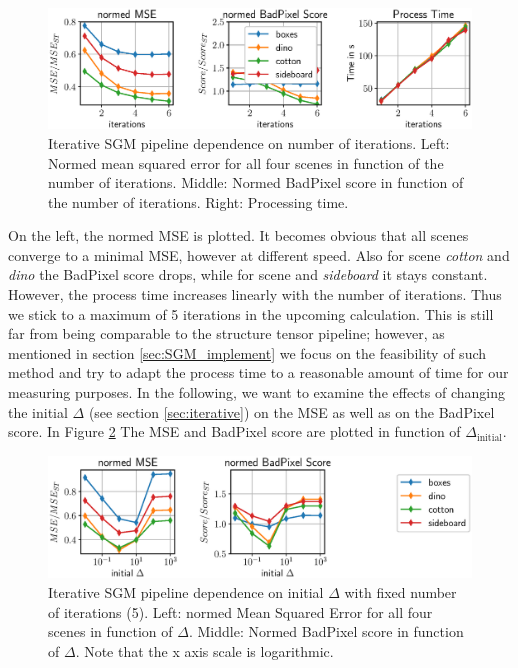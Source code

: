 \documentclass  [
  paper    = a4,
  BCOR     = 10mm,
  twoside,
  fontsize = 12pt,
  fleqn,
  toc      = bibnumbered,
  toc      = listofnumbered,
  numbers  = noendperiod,
  headings = normal,
  listof   = leveldown,
  version  = 3.03
]                                       {scrreprt}
\begin{document}
\begin{figure}[h!]
	\centering
	\includegraphics[width=1\linewidth]{images/choose_lower_sgm_ppr_merge_iterations}
	\caption[Iterative SGM dependence on number of iterations]{Iterative SGM pipeline dependence on number of iterations. Left: Normed mean squared error for all four scenes in function  of the number of iterations. Middle: Normed BadPixel score in function of the number of iterations. Right: Processing time.}
	\label{fig:chooselowersgmpprmergeiterations}
\end{figure}
On the left, the normed MSE is plotted. It becomes obvious that all scenes converge to a minimal MSE, however at different speed. Also for scene \textit{cotton} and \textit{dino} the BadPixel score drops, while for scene  and \textit{sideboard} it stays constant. However, the process time increases linearly with the number of iterations. Thus we stick to a maximum of 5 iterations in the upcoming calculation. This is still far from being comparable to the structure tensor pipeline; however, as mentioned in section \ref{sec:SGM_implement} we focus on the feasibility of such method and try to adapt the process time to a reasonable amount of time for our measuring purposes.
In the following, we want to examine the effects of changing the initial $\Delta$ (see section \ref{sec:iterative}) on the MSE as well as on the BadPixel score. In Figure \ref{fig:chooselowersgmppriterations5smoothingdelta} The MSE and BadPixel score are plotted in function of $\Delta_\text{initial}$.
\begin{figure}[h!]
	\centering
	\includegraphics[width=1\linewidth]{images/choose_lower_sgm_ppr_iterations_5_smoothing_delta}
	\caption[Iterative SGM dependence on initial $\Delta$ with 5 iterations]{Iterative SGM pipeline dependence on initial $\Delta$ with fixed number of iterations (5). Left: normed Mean Squared Error for all four scenes in function of $\Delta$. Middle: Normed BadPixel score in function of $\Delta$. Note that the x axis scale is logarithmic.}
	\label{fig:chooselowersgmppriterations5smoothingdelta}
\end{figure}
\end{document}
